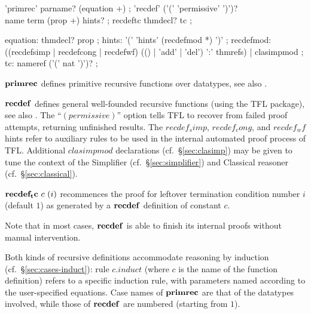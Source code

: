 



\begin{rail}
  'primrec' parname? (equation +)
  ;
  'recdef' ('(' 'permissive' ')')? \\ name term (prop +) hints?
  ;
  recdeftc thmdecl? tc
  ;

  equation: thmdecl? prop
  ;
  hints: '(' 'hints' (recdefmod *) ')'
  ;
  recdefmod: ((recdefsimp | recdefcong | recdefwf) (() | 'add' | 'del') ':' thmrefs) | clasimpmod
  ;
  tc: nameref ('(' nat ')')?
  ;
\end{rail}

\begin{descr}
  
\item [${\mathord{\mathbf{primrec}}}$] defines primitive recursive functions over
  datatypes, see also \cite{isabelle-HOL}.
  
\item [${\mathord{\mathbf{recdef}}}$] defines general well-founded recursive
  functions (using the TFL package), see also \cite{isabelle-HOL}.  The
  ``$(permissive)$'' option tells TFL to recover from failed proof attempts,
  returning unfinished results.  The $recdef_simp$, $recdef_cong$, and
  $recdef_wf$ hints refer to auxiliary rules to be used in the internal
  automated proof process of TFL.  Additional $clasimpmod$ declarations (cf.\ 
  \S\ref{sec:clasimp}) may be given to tune the context of the Simplifier
  (cf.\ \S\ref{sec:simplifier}) and Classical reasoner (cf.\ 
  \S\ref{sec:classical}).
  
\item [${\mathord{\mathbf{recdef_tc}}}~c~(i)$] recommences the proof for leftover
  termination condition number $i$ (default $1$) as generated by a
  ${\mathord{\mathbf{recdef}}}$ definition of constant $c$.
  
  Note that in most cases, ${\mathord{\mathbf{recdef}}}$ is able to finish its
  internal proofs without manual intervention.

\end{descr}

Both kinds of recursive definitions accommodate reasoning by induction (cf.\
\S\ref{sec:cases-induct}): rule $c\mathord{.}induct$ (where $c$ is the name of
the function definition) refers to a specific induction rule, with parameters
named according to the user-specified equations.  Case names of
${\mathord{\mathbf{primrec}}}$ are that of the datatypes involved, while those of
${\mathord{\mathbf{recdef}}}$ are numbered (starting from $1$).

